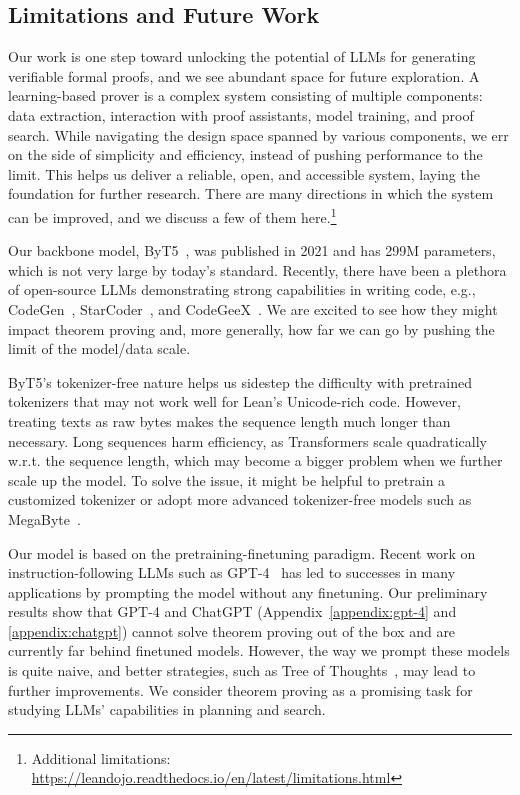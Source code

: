 \subsection{Limitations and Future Work}
\label{appendix:limitations}


Our work is one step toward unlocking the potential of LLMs for generating verifiable formal proofs, and we see abundant space for future exploration. A learning-based prover is a complex system consisting of multiple components: data extraction, interaction with proof assistants, model training, and proof search. While navigating the design space spanned by various components, we err on the side of simplicity and efficiency, instead of pushing performance to the limit. This helps us deliver a reliable, open, and accessible system, laying the foundation for further research. There are many directions in which the system can be improved, and we discuss a few of them here.\footnote{Additional limitations: \url{https://leandojo.readthedocs.io/en/latest/limitations.html}}


Our backbone model, ByT5~\cite{xue2022byt5}, was published in 2021 and has 299M parameters, which is not very large by today's standard. Recently, there have been a plethora of open-source LLMs demonstrating strong capabilities in writing code, e.g., CodeGen~\cite{nijkamp2022codegen},  StarCoder~\cite{li2023starcoder}, and CodeGeeX~\cite{zheng2023codegeex}. We are excited to see how they might impact theorem proving and, more generally, how far we can go by pushing the limit of the model/data scale. 

ByT5's tokenizer-free nature helps us sidestep the difficulty with pretrained tokenizers that may not work well for Lean's Unicode-rich code. However, treating texts as raw bytes makes the sequence length much longer than necessary. Long sequences harm efficiency, as Transformers scale quadratically w.r.t. the sequence length, which may become a bigger problem when we further scale up the model. To solve the issue, it might be helpful to pretrain a customized tokenizer or adopt more advanced tokenizer-free models such as MegaByte~\cite{yu2023megabyte}.


Our {\name} model is based on the pretraining-finetuning paradigm. Recent work on instruction-following LLMs such as GPT-4~\cite{openai2023gpt4} has led to successes in many applications by prompting the model without any finetuning. Our preliminary results show that GPT-4 and ChatGPT (Appendix~\ref{appendix:gpt-4} and \ref{appendix:chatgpt}) cannot solve theorem proving out of the box and are currently far behind finetuned models. However, the way we prompt these models is quite naive, and better strategies, such as Tree of Thoughts~\cite{yao2023tree}, may lead to further improvements. We consider theorem proving as a promising task for studying LLMs' capabilities in planning and search.


